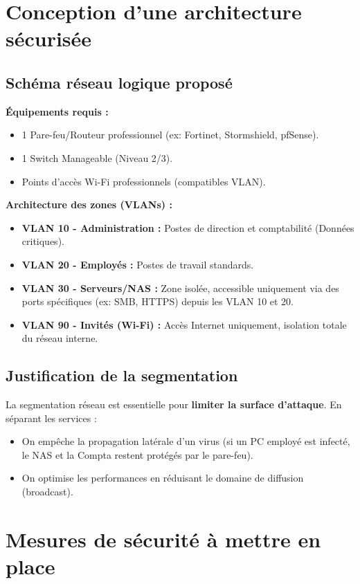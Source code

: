 \documentclass[a4paper,12pt]{article}
\begin{document}
\section{Conception d'une architecture sécurisée}

\subsection{Schéma réseau logique proposé}

\textbf{Équipements requis :}
\begin{itemize}
    \item 1 Pare-feu/Routeur professionnel (ex: Fortinet, Stormshield, pfSense).
    \item 1 Switch Manageable (Niveau 2/3).
    \item Points d'accès Wi-Fi professionnels (compatibles VLAN).
\end{itemize}

\textbf{Architecture des zones (VLANs) :}

\begin{itemize}
    \item \textbf{VLAN 10 - Administration :} Postes de direction et comptabilité (Données critiques).
    \item \textbf{VLAN 20 - Employés :} Postes de travail standards.
    \item \textbf{VLAN 30 - Serveurs/NAS :} Zone isolée, accessible uniquement via des ports spécifiques (ex: SMB, HTTPS) depuis les VLAN 10 et 20.
    \item \textbf{VLAN 90 - Invités (Wi-Fi) :} Accès Internet uniquement, isolation totale du réseau interne.
\end{itemize}

\subsection{Justification de la segmentation}
La segmentation réseau est essentielle pour \textbf{limiter la surface d'attaque}. En séparant les services :
\begin{itemize}
    \item On empêche la propagation latérale d'un virus (si un PC employé est infecté, le NAS et la Compta restent protégés par le pare-feu).
    \item On optimise les performances en réduisant le domaine de diffusion (broadcast).
\end{itemize}


\section{Mesures de sécurité à mettre en place}
\end{document}
